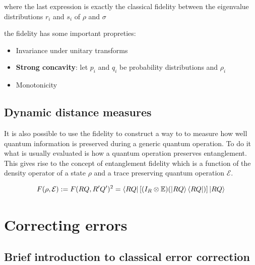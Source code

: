 \documentclass{article}
\begin{document}
where the last expression is exactly the classical fidelity between the eigenvalue
distributions $r_i$ and $s_i$ of $\rho$ and $\sigma$

the fidelity has some important propreties:
\begin{itemize}
	\item Invariance under unitary transforms
	\item \textbf{Strong concavity}: let $p_i$ and $q_i$ be probability distributions
	      and $\rho_i$
	\item Monotonicity
\end{itemize}
\subsection{Dynamic distance measures}

It is also possible to use the fidelity to construct a way to to measure how
well quantum information is preserved during a generic quantum operation.
To do it what is usually evaluated is how a quantum operation preserves
entanglement.
This gives rise to the concept of entanglement fidelity which is a function
of the density operator of a state $\rho$ and a trace preserving quantum operation
$\mathcal{E}$.

\begin{equation}
	F(\rho,\mathcal{E}) := F(RQ,R'Q')^2 = \bra{RQ} \left[ (I_R \otimes \mathbb{E})(\ket{RQ}\bra{RQ}) \right] \ket{RQ}
\end{equation}



\section{Correcting errors}

\subsection{Brief introduction to classical error correction}
\end{document}

